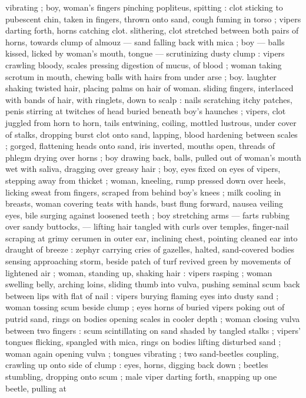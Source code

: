 vibrating ; boy, woman's fingers pinching popliteus, spitting : clot
sticking to pubescent chin, taken in fingers, thrown onto sand, cough
fuming in torso ; vipers darting forth, horns catching clot. slithering,
clot stretched between both pairs of horns, towards clump of almouz
--- sand falling back with mica ; boy --- balls kissed, licked by
woman's mouth, tongue --- scrutinizing dusty clump : vipers crawling
bloody, scales pressing digestion of mucus, of blood ; woman taking
scrotum in mouth, chewing balls with hairs from under arse ; boy.
laughter shaking twisted hair, placing palms on hair of woman. sliding
fingers, interlaced with bands of hair, with ringlets, down to scalp :
nails scratching itchy patches, penis stirring at twitches of head
buried beneath boy's haunches ; vipers, clot juggled from horn to
horn, tails entwining, coiling, mottled lustrous, under cover of stalks,
dropping burst clot onto sand, lapping, blood hardening between
scales ; gorged, flattening heads onto sand, iris inverted, mouths
open, threads of phlegm drying over horns ; boy drawing back, balls,
pulled out of woman's mouth wet with saliva, dragging over greasy
hair ; boy, eyes fixed on eyes of vipers, stepping away from thicket ;
woman, kneeling, rump pressed down over heels, licking sweat from
fingers, scraped from behind boy's knees ; milk cooling in breasts,
woman covering teats with hands, bust flung forward, nausea veiling
eyes, bile surging against loosened teeth ; boy stretching arms ---
farts rubbing over sandy buttocks, --- lifting hair tangled with curls
over temples, finger-nail scraping at grimy cerumen in outer ear,
inclining chest, pointing cleaned ear into draught of breeze : zephyr
carrying cries of gazelles, halted, sand-covered bodies sensing
approaching storm, beside patch of turf revived green by
movements of lightened air ; woman, standing up, shaking hair :
vipers rasping ; woman swelling belly, arching loins, sliding thumb
into vulva, pushing seminal scum back between lips with flat of nail :
vipers burying flaming eyes into dusty sand ; woman tossing scum
beside clump ; eyes horns of buried vipers poking out of putrid
sand, rings on bodies opening scales in cooler depth ; woman closing
vulva between two fingers : scum scintillating on sand shaded by
tangled stalks ; vipers’ tongues flicking, spangled with mica, rings on
bodies lifting disturbed sand ; woman again opening vulva ; tongues
vibrating ; two sand-beetles coupling, crawling up onto side of clump
: eyes, horns, digging back down ; beetles stumbling, dropping onto
scum ; male viper darting forth, snapping up one beetle, pulling at
